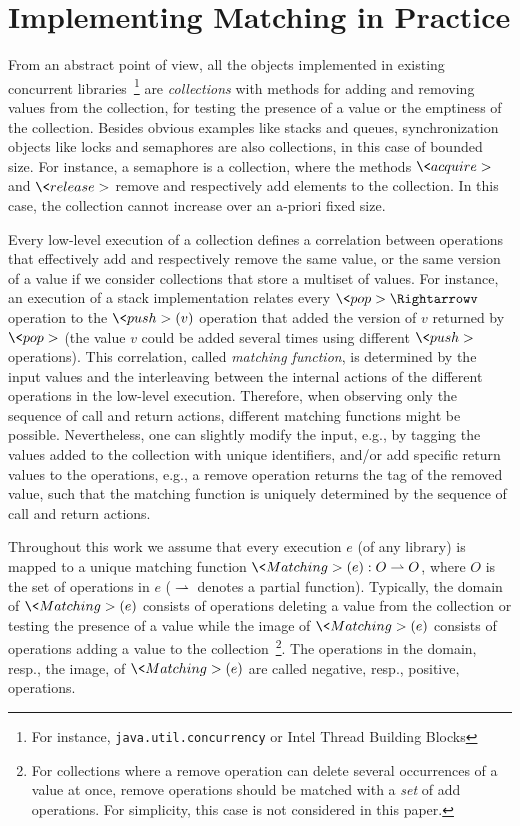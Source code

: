 
\section{Implementing Matching in Practice}
\label{sec:matching}

From an abstract point of view, all the objects implemented in existing 
concurrent libraries~\footnote{For instance, {\tt java.util.concurrency} or Intel Thread Building Blocks}
are \emph{collections} with methods for adding and removing values from the collection, for testing the presence 
of a value or the emptiness of the collection. Besides obvious examples like stacks and queues, 
synchronization objects like locks and semaphores are also collections, in this case of bounded size. 
For instance, a semaphore is a collection, where the methods $\<acquire>$ and $\<release>$
remove and respectively add elements to the collection. In this case, the collection cannot 
increase over an a-priori fixed size.

Every low-level execution of a collection defines a correlation between operations that effectively add 
and respectively remove the same value, or the same version of a value if we consider collections
that store a multiset of values. For instance, an execution of a stack implementation relates
every $\<pop>\Rightarrowv$ operation to the $\<push>(v)$ operation that added the version of $v$ returned 
by $\<pop>$ (the value $v$ could be added several times using different $\<push>$ operations).
This correlation, called \emph{matching function}, 
is determined by the input values and the interleaving between the internal actions of 
the different operations in the low-level execution. Therefore, when observing only the sequence of call
and return actions, different matching functions might be possible. Nevertheless, one can 
slightly modify the input, e.g., by tagging the values added to the collection with unique identifiers, 
and/or add specific return values to the operations, e.g., a remove operation returns
the tag of the removed value, such that the matching
function is uniquely determined by the sequence of call and return actions.

Throughout this work we assume that every execution $e$ (of any library) is mapped to 
a unique matching function $\<Matching>(e):O \rightharpoonup O$, where $O$ is the set of operations in $e$
($\rightharpoonup$ denotes a partial function).
Typically, the domain of $\<Matching>(e)$ consists of operations deleting a value from the collection or 
testing the presence of a value while the image of $\<Matching>(e)$ consists of operations  
adding a value to the collection~\footnote{For collections where a remove operation can delete 
several occurrences of a value at once, remove operations should be matched with a \emph{set} 
of add operations. For simplicity, this case is not considered in this paper.}.
The operations in the domain, resp., the image, of $\<Matching>(e)$ are called negative, resp., positive, operations.

